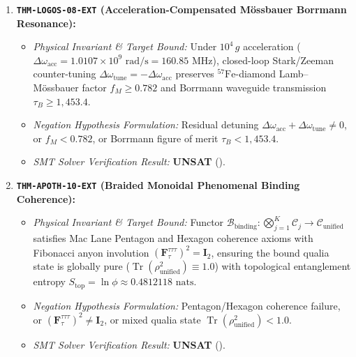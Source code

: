 \documentclass[11pt,onecolumn]{article}
\begin{document}
\begin{enumerate}
    \item \textbf{\texttt{THM-LOGOS-08-EXT} (Acceleration-Compensated M\"ossbauer Borrmann Resonance):}
    \begin{itemize}
        \item \emph{Physical Invariant \& Target Bound:} Under $10^4\,g$ acceleration ($\Delta\omega_{\mathrm{acc}} = 1.0107 \times 10^9\text{ rad/s} = 160.85\text{ MHz}$), closed-loop Stark/Zeeman counter-tuning $\Delta\omega_{\mathrm{tune}} = -\Delta\omega_{\mathrm{acc}}$ preserves ${}^{57}\mathrm{Fe}$-diamond Lamb--M\"ossbauer factor $f_M \ge 0.782$ and Borrmann waveguide transmission $\tau_B \ge 1{,}453.4$.
        \item \emph{Negation Hypothesis Formulation:} Residual detuning $\Delta\omega_{\mathrm{acc}} + \Delta\omega_{\mathrm{tune}} \neq 0$, or $f_M < 0.782$, or Borrmann figure of merit $\tau_B < 1{,}453.4$.
        \item \emph{SMT Solver Verification Result:} \textbf{UNSAT} ().
    \end{itemize}

    \item \textbf{\texttt{THM-APOTH-10-EXT} (Braided Monoidal Phenomenal Binding Coherence):}
    \begin{itemize}
        \item \emph{Physical Invariant \& Target Bound:} Functor $\mathcal{B}_{\mathrm{binding}}: \bigotimes_{j=1}^K \mathcal{C}_j \to \mathcal{C}_{\mathrm{unified}}$ satisfies Mac Lane Pentagon and Hexagon coherence axioms with Fibonacci anyon involution $(\mathbf{F}_\tau^{\tau\tau\tau})^2 = \mathbf{I}_2$, ensuring the bound qualia state is globally pure ($\operatorname{Tr}(\rho_{\mathrm{unified}}^2) \equiv 1.0$) with topological entanglement entropy $S_{\mathrm{top}} = \ln\phi \approx 0.4812118\text{ nats}$.
        \item \emph{Negation Hypothesis Formulation:} Pentagon/Hexagon coherence failure, or $(\mathbf{F}_\tau^{\tau\tau\tau})^2 \neq \mathbf{I}_2$, or mixed qualia state $\operatorname{Tr}(\rho_{\mathrm{unified}}^2) < 1.0$.
        \item \emph{SMT Solver Verification Result:} \textbf{UNSAT} ().
    \end{itemize}


\end{enumerate}
\end{document}
